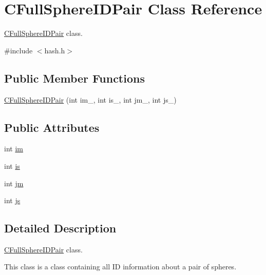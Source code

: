 \hypertarget{classCFullSphereIDPair}{\section{C\-Full\-Sphere\-I\-D\-Pair Class Reference}
\label{classCFullSphereIDPair}
}


\hyperlink{classCFullSphereIDPair}{C\-Full\-Sphere\-I\-D\-Pair} class.  




{\ttfamily \#include $<$hash.\-h$>$}

\subsection*{Public Member Functions}
\begin{DoxyCompactItemize}
\item 
\hyperlink{classCFullSphereIDPair_a9ce7c9ddb7371ee54413bf7a98288b80}{C\-Full\-Sphere\-I\-D\-Pair} (int im\-\_\-, int is\-\_\-, int jm\-\_\-, int js\-\_\-)
\end{DoxyCompactItemize}
\subsection*{Public Attributes}
\begin{DoxyCompactItemize}
\item 
int \hyperlink{classCFullSphereIDPair_a60629b97e6033458a0f053553e420a33}{im}
\item 
int \hyperlink{classCFullSphereIDPair_a8a6a419f8b195dad9eaf0efdef334160}{is}
\item 
int \hyperlink{classCFullSphereIDPair_a8d5d6e6632c185395142b1c0e9775f4b}{jm}
\item 
int \hyperlink{classCFullSphereIDPair_a5cf4df87753da2163a40a0bb08d50bd4}{js}
\end{DoxyCompactItemize}


\subsection{Detailed Description}
\hyperlink{classCFullSphereIDPair}{C\-Full\-Sphere\-I\-D\-Pair} class. 

This class is a class containing all I\-D information about a pair of spheres. 

